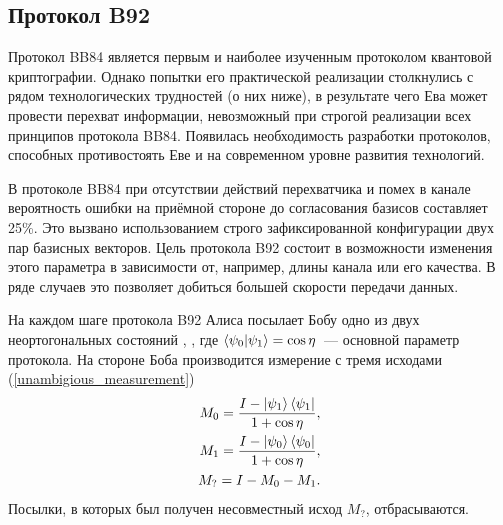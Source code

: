 \begin{comment}
\paragraph{Атака с измерениями с тремя исходами} 
Наибольший интерес (в частности для релятивистской квантовой криптографии) представляет собой атака, в которой используются рассмотренные выше измерения с тремя исходами. Суть ее состоит в следующем.
Ева перехватывает каждую отдельную посылку от Алисы к Бобу и проводит над ней измерение с тремя исходами.
Если она получила определенный результат, то она точно знает, какое состояние посылала Алиса, и может приготовить такое же для отправки его дальше Бобу. Если же был получен неопределенный результат, то Еве остается только угадать правильное состояние
\end{comment}
\subsection{Протокол B92}
Протокол BB84 является первым и наиболее изученным протоколом квантовой криптографии. Однако попытки его практической реализации столкнулись с рядом технологических трудностей (о них ниже), в результате чего Ева может провести перехват информации, невозможный при строгой реализации всех принципов протокола BB84. Появилась необходимость разработки протоколов, способных противостоять Еве и на современном уровне развития технологий.

В протоколе BB84 при отсутствии действий перехватчика и помех в канале вероятность ошибки на приёмной стороне до согласования базисов составляет 25\%. Это вызвано использованием строго зафиксированной конфигурации двух пар базисных векторов. Цель протокола B92 \cite{non_orthogonal_states_discrimination_theorem} состоит в возможности изменения этого параметра в зависимости от, например, длины канала или его качества. В ряде случаев это позволяет добиться большей скорости передачи данных.

На каждом шаге протокола B92 Алиса посылает Бобу одно из двух неортогональных состояний , , где $\left\langle \psi_0|\psi_1\right\rangle = \cos \eta$~--- основной параметр протокола. На стороне Боба производится измерение с тремя исходами (\ref{unambigious_measurement})
\begin{eqnarray}
  M_0 = \frac{I - \left| \psi_1 \right\rangle\left\langle \psi_1 \right|}{1 + \cos \eta}, \nonumber\\
  M_1 = \frac{I - \left| \psi_0 \right\rangle\left\langle \psi_0 \right|}{1 + \cos \eta}, \nonumber\\
  M_? = I - M_0 - M_1.
\end{eqnarray}
Посылки, в которых был получен несовместный исход $M_?$, отбрасываются.

